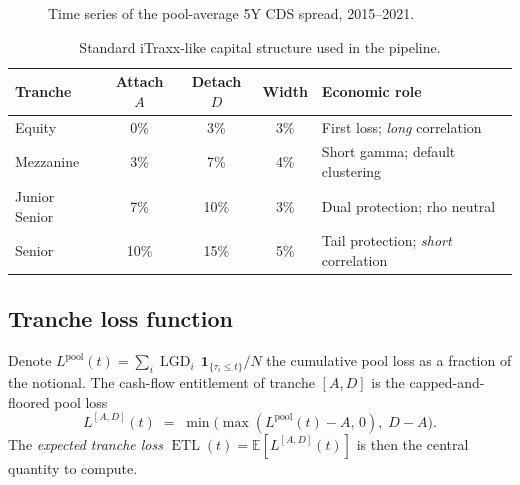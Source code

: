 \documentclass[11pt,a4paper]{article}
\newcommand{\E}{\mathbb{E}}
\newcommand{\1}{\mathbf{1}}
\DeclareMathOperator{\LGD}{LGD}
\DeclareMathOperator{\ETL}{ETL}
\begin{document}
\begin{figure}[H]
    \centering
    \caption{Time series of the pool-average 5Y CDS spread, 2015--2021.}
    \label{fig:cds_ts}
\end{figure}

\begin{table}[H]
\centering
\caption{Standard iTraxx-like capital structure used in the pipeline.}
\label{tab:capital_struct}
\begin{tabular}{lcccl}
\toprule
\textbf{Tranche} & \textbf{Attach} $A$ & \textbf{Detach} $D$ &
\textbf{Width} & \textbf{Economic role}\\
\midrule
Equity          & 0\%  & 3\%  & 3\% & First loss; \emph{long} correlation\\
Mezzanine       & 3\%  & 7\%  & 4\% & Short gamma; default clustering\\
Junior Senior   & 7\%  & 10\% & 3\% & Dual protection; rho neutral\\
Senior          & 10\% & 15\% & 5\% & Tail protection; \emph{short} correlation\\
\bottomrule
\end{tabular}
\end{table}

\subsection{Tranche loss function}
Denote \(L^{\text{pool}}(t)=\sum_{i}\LGD_{i}\,\1_{\{\tau_{i}\le t\}}/N\)
the cumulative pool loss as a fraction of the notional. The
cash-flow entitlement of tranche \([A,D]\) is the capped-and-floored
pool loss
\begin{equation}
L^{[A,D]}(t) \;=\; \min\!\bigl(\max(L^{\text{pool}}(t)-A,\,0),\;D-A\bigr).
\label{eq:tranche_loss}
\end{equation}
The \emph{expected tranche loss} \(\ETL(t) = \E[L^{[A,D]}(t)]\) is
then the central quantity to compute.
\end{document}
